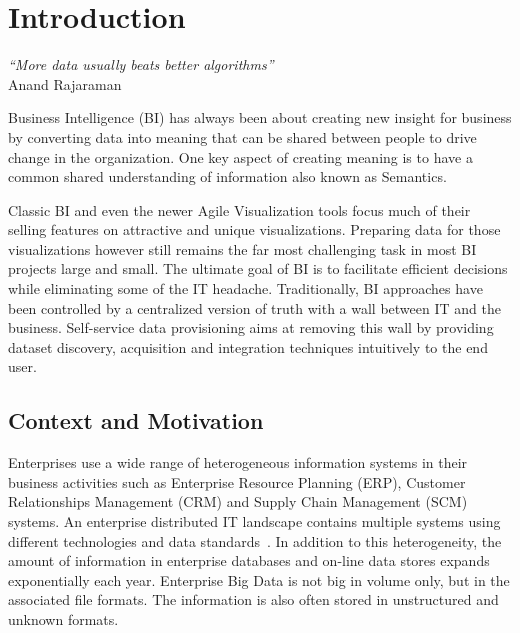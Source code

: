 \chapter{Introduction}  \label{chapter:introduction}
\graphicspath{{introduction/figures/}}

\begin{flushright}
\textit{``More data usually beats better algorithms''}\\
 Anand Rajaraman

\end{flushright}

Business Intelligence (BI) has always been about creating new insight for business by converting data into meaning that can be shared between people to drive change in the organization. One key aspect of creating meaning is to have a common shared understanding of information also known as Semantics.

Classic BI and even the newer Agile Visualization tools focus much of their selling features on attractive and unique visualizations. Preparing data for those visualizations however still remains the far most challenging task in most BI projects large and small. The ultimate goal of BI is to facilitate efficient decisions while eliminating some of the IT headache. Traditionally, BI approaches have been controlled by a centralized version of truth with a wall between IT and the business. Self-service data provisioning aims at removing this wall by providing dataset discovery, acquisition and integration techniques intuitively to the end user.

\section{Context and Motivation} \label{section:motivation}

Enterprises use a wide range of heterogeneous information systems in their business activities such as Enterprise Resource Planning (ERP), Customer Relationships Management (CRM) and Supply Chain Management (SCM) systems. An enterprise distributed IT landscape contains multiple systems using different technologies and data standards~\cite{Mihindukulasooriya:COLD:13}. In addition to this heterogeneity, the amount of information in enterprise databases and on-line data stores expands exponentially each year. Enterprise Big Data is not big in volume only, but in the associated file formats. The information is also often stored in unstructured and unknown formats.

